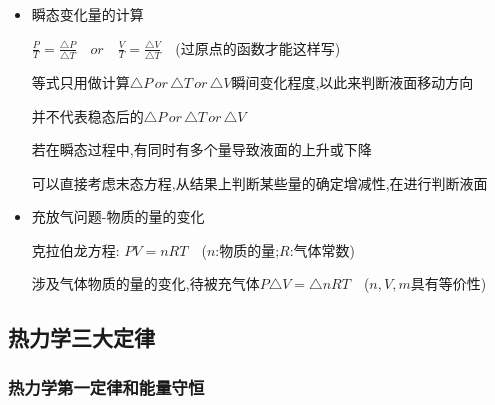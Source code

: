 \documentclass{article}
\begin{document}
\begin{itemize}
    \item 瞬态变化量的计算

          $ \frac{P}{T} = \frac{\triangle P}{\triangle T} \quad or \quad \frac{V}{T} = \frac{\triangle V}{\triangle T}  \quad $(过原点的函数才能这样写)

          等式只用做计算$\triangle P \,or\, \triangle T \, or \, \triangle V$瞬间变化程度,以此来判断液面移动方向

          并不代表稳态后的$\triangle P \,or\, \triangle T \,or\, \triangle V$

          若在瞬态过程中,有同时有多个量导致液面的上升或下降

          可以直接考虑末态方程,从结果上判断某些量的确定增减性,在进行判断液面

    \item 充放气问题-物质的量的变化

          克拉伯龙方程: $PV = n R T \quad $($n$:物质的量;$R$:气体常数)

          涉及气体物质的量的变化,待被充气体$P\triangle V = \triangle n RT \quad $($n,V,m$具有等价性)

\end{itemize}

\vspace{2em}

\subsection{热力学三大定律}
\subsubsection{热力学第一定律和能量守恒}
\end{document}

